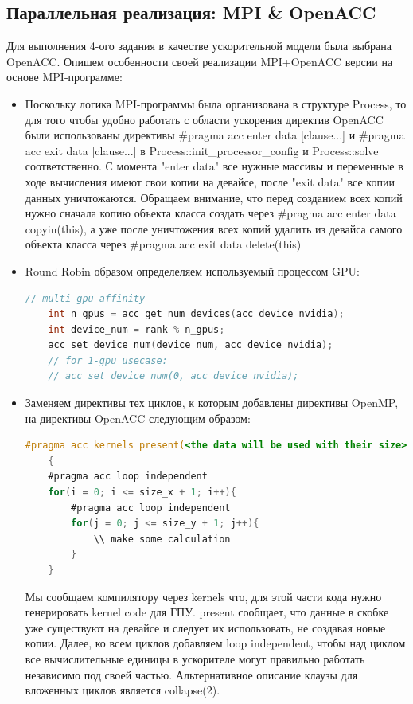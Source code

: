 \documentclass{article}
\begin{document}
\subsection{Параллельная реализация: MPI \& OpenACC}
Для выполнения 4-ого задания в качестве ускорительной модели была выбрана OpenACC. Опишем особенности своей реализации MPI+OpenACC версии на основе MPI-программе:
\begin{itemize}
    \item Поскольку логика MPI-программы была организована в структуре Process, то для того чтобы удобно работать с области ускорения директив OpenACC были использованы директивы \#pragma acc enter data [clause...] и \#pragma acc exit data [clause...] в Process::init\_processor\_config и Process::solve соответственно. С момента "enter data" все нужные массивы и переменные в ходе вычисления имеют свои копии на девайсе, после "exit data" все копии данных уничтожаются. Обращаем внимание, что перед созданием всех копий нужно сначала копию объекта класса создать через \#pragma acc enter data copyin(this), а уже после уничтожения всех копий удалить из девайса самого объекта класса через \#pragma acc exit data delete(this)
    \item Round Robin образом определеляем используемый процессом GPU: 
    \begin{lstlisting}[language=C]
    // multi-gpu affinity
    int n_gpus = acc_get_num_devices(acc_device_nvidia);
    int device_num = rank % n_gpus;
    acc_set_device_num(device_num, acc_device_nvidia);
    // for 1-gpu usecase:
    // acc_set_device_num(0, acc_device_nvidia);
    \end{lstlisting}
    \item Заменяем директивы тех циклов, к которым добавлены директивы OpenMP, на директивы OpenACC следующим образом:
    \begin{lstlisting}[language=C]
    #pragma acc kernels present(<the data will be used with their size>)
    {
    #pragma acc loop independent
    for(i = 0; i <= size_x + 1; i++){
        #pragma acc loop independent
        for(j = 0; j <= size_y + 1; j++){
            \\ make some calculation
        }
    }
    \end{lstlisting}
    Мы сообщаем компилятору через kernels что, для этой части кода нужно генерировать kernel code для ГПУ. present сообщает, что данные в скобке уже существуют на девайсе и следует их использовать, не создавая новые копии. Далее, ко всем циклов добавляем loop independent, чтобы над циклом все вычислительные единицы в ускорителе могут правильно работать независимо под своей частью. Альтернативное описание клаузы для вложенных циклов является collapse(2).

\end{itemize}
\end{document}
